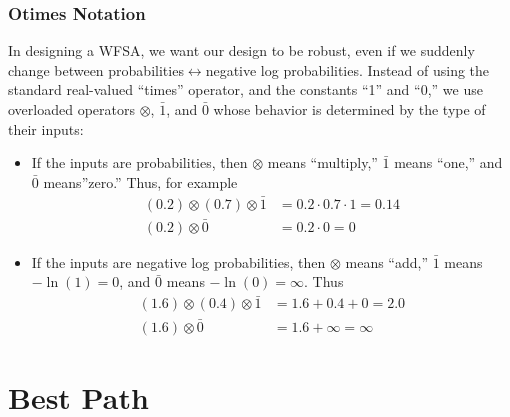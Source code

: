 \documentclass{beamer}
\begin{document}
\begin{frame}
  \frametitle{Otimes Notation}

  In designing a WFSA, we want our design to be robust, even if we
  suddenly change between probabilities$\leftrightarrow$negative log
  probabilities.  Instead of using the standard
  real-valued ``times'' operator, and the constants ``1'' and ``0,''
  we use overloaded operators $\otimes$,
  $\bar{1}$, and $\bar{0}$ whose behavior is determined by the type  of their inputs:
  \begin{itemize}
  \item If the inputs are probabilities, then $\otimes$ means
    ``multiply,'' $\bar{1}$ means ``one,'' and $\bar{0}$
    means''zero.''  Thus, for example
    \begin{align*}
      (0.2)\otimes(0.7)\otimes\bar{1} &= 0.2\cdot 0.7\cdot 1 = 0.14\\
      (0.2)\otimes\bar{0} &= 0.2\cdot 0 = 0
    \end{align*}
  \item If the inputs are negative log probabilities, then $\otimes$
    means ``add,'' $\bar{1}$ means $-\ln(1)=0$, and $\bar{0}$ means $-\ln(0)=\infty$.  Thus
    \begin{align*}
      (1.6)\otimes(0.4)\otimes\bar{1} &= 1.6+0.4+0 = 2.0\\
      (1.6)\otimes\bar{0} &= 1.6+\infty = \infty
    \end{align*}
  \end{itemize}
\end{frame}

\section[Best Path]{Best Path}
\setcounter{subsection}{1}
\end{document}
